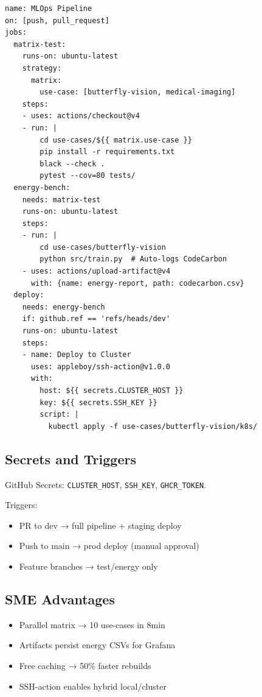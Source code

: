 \begin{verbatim}
name: MLOps Pipeline
on: [push, pull_request]
jobs:
  matrix-test:
    runs-on: ubuntu-latest
    strategy:
      matrix:
        use-case: [butterfly-vision, medical-imaging]
    steps:
    - uses: actions/checkout@v4
    - run: |
        cd use-cases/${{ matrix.use-case }}
        pip install -r requirements.txt
        black --check .
        pytest --cov=80 tests/
  energy-bench:
    needs: matrix-test
    runs-on: ubuntu-latest
    steps:
    - run: |
        cd use-cases/butterfly-vision
        python src/train.py  # Auto-logs CodeCarbon
    - uses: actions/upload-artifact@v4
      with: {name: energy-report, path: codecarbon.csv}
  deploy:
    needs: energy-bench
    if: github.ref == 'refs/heads/dev'
    runs-on: ubuntu-latest
    steps:
    - name: Deploy to Cluster
      uses: appleboy/ssh-action@v1.0.0
      with:
        host: ${{ secrets.CLUSTER_HOST }}
        key: ${{ secrets.SSH_KEY }}
        script: |
          kubectl apply -f use-cases/butterfly-vision/k8s/
\end{verbatim}

\subsection{Secrets and Triggers}

GitHub Secrets: \texttt{CLUSTER\_HOST}, \texttt{SSH\_KEY}, \texttt{GHCR\_TOKEN}.

Triggers:
\begin{itemize}
    \item PR to dev → full pipeline + staging deploy
    \item Push to main → prod deploy (manual approval)
    \item Feature branches → test/energy only
\end{itemize}

\subsection{SME Advantages}

\begin{itemize}
    \item Parallel matrix → 10 use-cases in 8min
    \item Artifacts persist energy CSVs for Grafana
    \item Free caching → 50\% faster rebuilds
    \item SSH-action enables hybrid local/cluster
\end{itemize}

